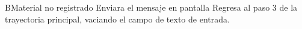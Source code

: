 		
		\begin{UCtrayectoriaA}{B}{Material no registrado}
			\UCpaso[\UCsist] Enviara el mensaje en pantalla 
			\UCpaso[\UCsist] Regresa al paso 3 de la trayectoria principal, vaciando el campo de texto de entrada.
		\end{UCtrayectoriaA}	
		
		
		
		
		
		
